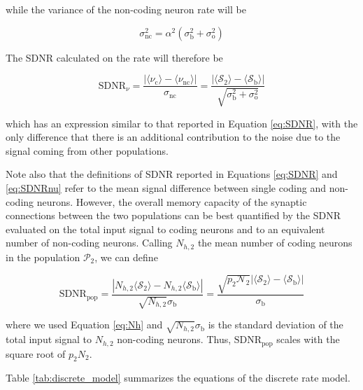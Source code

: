 \documentclass[a4paper, 12pt, twoside, openright]{book}
\newcommand{\popII}{\mathcal{P}_2}
\newcommand{\NII}{\mathcal{N}_2}
\newcommand{\SII}{\mathcal{S}_\text{2}}
\newcommand{\Sb}{\mathcal{S}_\text{b}}
\begin{document}
while the variance of the non-coding neuron rate will be

\begin{equation}
\sigma_\text{nc}^2 = \alpha^2 (\sigma_\text{b}^2 + \sigma_\text{o}^2)
\end{equation}

The SDNR calculated on the rate will therefore be

\begin{equation}
\label{eq:SDNRnu}
    \text{SDNR}_\nu = 
    \dfrac{|\langle\nu_\text{c}\rangle - \langle\nu_\text{nc}\rangle|}
    {\sigma_\text{nc}} =
        \dfrac{|\langle \SII \rangle - \langle \Sb \rangle |}
        {\sqrt{\sigma_\text{b}^2 + \sigma_\text{o}^2}}
\end{equation}

which has an expression similar to that reported in Equation \eqref{eq:SDNR}, with the only difference that there is an additional contribution to the noise due to the signal coming from other populations.

Note also that the definitions of SDNR reported in Equations \eqref{eq:SDNR} and \eqref{eq:SDNRnu} refer to the mean signal difference between single coding and non-coding neurons. However, the overall memory capacity of the synaptic connections between the two populations can be best quantified by the SDNR evaluated on the total input signal to coding neurons and to an equivalent number of non-coding neurons.
Calling $N_{h,2}$ the mean number of coding neurons in the population $\popII$, we can define

\begin{equation}
\label{eq:SDNRpop}
\text{SDNR}_\text{pop} = 
    \dfrac{|
    N_{h,2}
    \langle \SII \rangle - N_{h,2}
    \langle \Sb \rangle |}
        {\sqrt{N_{h,2}}
        \sigma_\text{b}} =
    \dfrac{\sqrt{p_2 \NII}
    |\langle \SII \rangle -
    \langle \Sb \rangle |}
        {\sigma_\text{b}}
\end{equation}

where we used Equation \eqref{eq:Nh} and $\sqrt{N_{h,2}}\sigma_\text{b}$ is the standard deviation of the total input signal to $N_{h,2}$ non-coding neurons.
Thus, $\text{SDNR}_\text{pop}$ scales with the square root of $p_2 N_2$.

Table \ref{tab:discrete_model} summarizes the equations of the discrete rate model.
\end{document}
